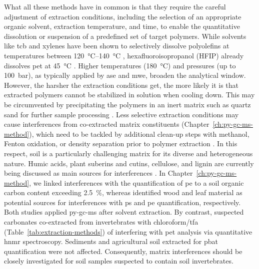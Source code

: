 What all these methods have in common is that they require the careful adjustment of extraction conditions, including the selection of an appropriate organic solvent, extraction temperature, and time, to enable the quantitative dissolution or suspension of a predefined set of target polymers. While solvents like \ac{tcb} and xylenes have been shown to selectively dissolve polyolefins at temperatures between \SIrange[range-phrase = { and }]{120}{140}{\degreeCelsius} \citep[Chapter~\ref{ch:py-gc-ms-method};][]{CeccariniHidden2018}, hexafluoroisopropanol (HFIP) already dissolves \ac{pet} at \SI{45}{\degreeCelsius} \citep{ElertComparison2017}. Higher temperatures (\SI{180}{\degreeCelsius}) and pressures (up to \SI{100}{\bar}), as typically applied by \ac{ase} and \ac{mwe}, broaden the analytical window. However, the harsher the extraction conditions get, the more likely it is that extracted polymers cannot be stabilized in solution when cooling down. This may be circumvented by precipitating the polymers in an inert matrix such as quartz sand for further sample processing \citep{DierkesQuantification2019}. Less selective extraction conditions may cause interferences from co-extracted matrix constituents (Chapter~\ref{ch:py-gc-ms-method}), which need to be tackled by additional clean-up steps with methanol, Fenton oxidation, or density separation prior to polymer extraction \citep{DierkesQuantification2019,PeezQuantitative2019}. In this respect, soil is a particularly challenging matrix for its diverse and heterogeneous nature.
Humic acids, plant suberins and cutins, cellulose, and lignin are currently being discussed as main sources for interferences \citep[Chapter~\ref{ch:py-gc-ms-method};][]{DierkesQuantification2019,OkoffoIdentification2020}.
In Chapter~\ref{ch:py-gc-ms-method}, we linked interferences with the quantification of \ac{pe} to a soil organic carbon content exceeding \SI{2.5}{\percent}, whereas \citet{DierkesQuantification2019} identified wood and leaf material as potential sources for interferences with \ac{ps} and \ac{pe} quantification, respectively. Both studies applied \ac{py-gc-ms} after solvent extraction. By contrast, \citet{PeezQuantitative2019} suspected carbonates co-extracted from invertebrates with chloroform\slash\ac{tfa} (Table~\ref{tab:extraction-methods}) of interfering with \ac{pet} analysis via quantitative \ac{hnmr} spectroscopy.
Sediments \citep{PeezQuantitative2019} and agricultural soil extracted for \ac{pbat} quantification \citep{NelsonQuantification2019} were not affected. Consequently, matrix interferences should be closely investigated for soil samples suspected to contain soil invertebrates.

